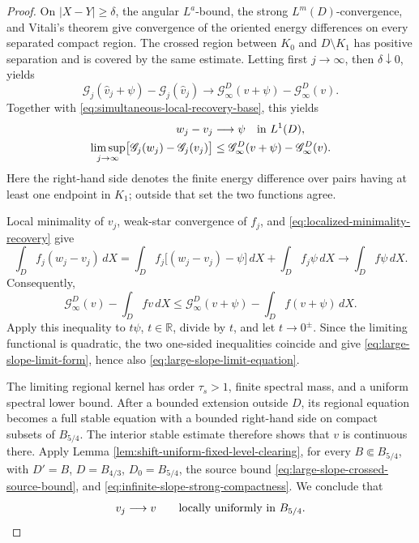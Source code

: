 \documentclass[11pt,reqno]{amsart}
\numberwithin{equation}{section}
\newcommand{\R}{\mathbb R}
\newcommand{\dd}{\,d}
\theoremstyle{remark}
\begin{document}
\begin{proof}
On \(|X-Y|\ge\delta\), the angular \(L^a\)-bound, the strong
\(L^m(D)\)-convergence, and Vitali's theorem give convergence of the
oriented energy differences on every separated compact region.  The
crossed region between \(K_0\) and \(D\setminus K_1\) has positive
separation and is covered by the same estimate.  Letting first
\(j\to\infty\), then
\(\delta\downarrow0\), yields
\[
 \mathscr G_j(\widehat v_j+\psi)-\mathscr G_j(\widehat v_j)
 \longrightarrow
 \mathscr G_\infty^D(v+\psi)-\mathscr G_\infty^D(v).
\]
Together with \eqref{eq:simultaneous-local-recovery-base}, this yields
\begin{align}
 w_j-v_j&\longrightarrow\psi\quad\hbox{in }L^1(D),\notag\\
 \limsup_{j\to\infty}
 \bigl[\mathscr G_j(w_j)-\mathscr G_j(v_j)\bigr]
 &\le
 \mathscr G_\infty^D(v+\psi)-\mathscr G_\infty^D(v).
 \label{eq:localized-minimality-recovery}
\end{align}
Here the right-hand side denotes the finite energy difference over
pairs having at least one endpoint in \(K_1\); outside that set the two
functions agree.

Local minimality of \(v_j\), weak-star convergence of \(f_j\), and
\eqref{eq:localized-minimality-recovery} give
\[
 \int_Df_j(w_j-v_j)\dd X
 =\int_Df_j\bigl[(w_j-v_j)-\psi\bigr]\dd X
  +\int_Df_j\psi\dd X
 \longrightarrow\int_Df\psi\dd X.
\]
Consequently,
\[
 \mathscr G_\infty^D(v)-\int_Dfv\dd X
 \le
 \mathscr G_\infty^D(v+\psi)-\int_Df(v+\psi)\dd X.
\]
Apply this inequality to \(t\psi\), \(t\in\R\), divide by \(t\), and
let \(t\to0^\pm\).  Since the limiting functional is quadratic, the
two one-sided inequalities coincide and give
\eqref{eq:large-slope-limit-form}, hence also
\eqref{eq:large-slope-limit-equation}.

The limiting regional kernel has order \(\tau_s>1\), finite spectral
mass, and a uniform spectral lower bound.  After a bounded extension
outside \(D\), its regional equation becomes a full stable equation
with a bounded right-hand side on compact subsets of \(B_{5/4}\).
The interior stable estimate \cite{RosOtonSerraStable} therefore shows
that \(v\) is continuous there.  Apply Lemma
\ref{lem:shift-uniform-fixed-level-clearing}, for every
\(B\Subset B_{5/4}\), with
\(D'=B\), \(D=B_{4/3}\), \(D_0=B_{5/4}\), the source bound
\eqref{eq:large-slope-crossed-source-bound}, and
\eqref{eq:infinite-slope-strong-compactness}.  We conclude that
\begin{equation}
 v_j\longrightarrow v\qquad\hbox{locally uniformly in }B_{5/4}.
 \label{eq:infinite-slope-local-uniform-convergence}
\end{equation}


\end{proof}
\end{document}
